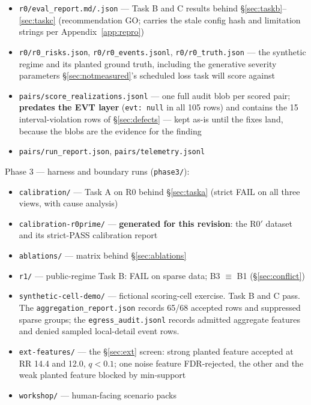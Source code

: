 \documentclass[11pt]{article}
\begin{document}
\begin{itemize}[leftmargin=1.4em,itemsep=1pt]
\item \texttt{r0/eval\_report.md/.json} --- Task B and C results behind
  \S\ref{sec:taskb}--\ref{sec:taskc} (recommendation GO; carries the stale
  config hash and limitation strings per Appendix~\ref{app:repro})
\item \texttt{r0/r0\_risks.json}, \texttt{r0/r0\_events.jsonl},
  \texttt{r0/r0\_truth.json} --- the synthetic regime and its planted
  ground truth, including the generative severity parameters
  \S\ref{sec:notmeasured}'s scheduled loss task will score against
\item \texttt{pairs/score\_realizations.jsonl} --- one full audit blob per
  scored pair; \textbf{predates the EVT layer} (\texttt{evt: null} in all
  105 rows) and contains the 15 interval-violation rows of
  \S\ref{sec:defects} --- kept as-is until the fixes land, because the
  blobs are the evidence for the finding
\item \texttt{pairs/run\_report.json}, \texttt{pairs/telemetry.jsonl}
\end{itemize}

Phase 3 --- harness and boundary runs (\texttt{phase3/}):

\begin{itemize}[leftmargin=1.4em,itemsep=1pt]
\item \texttt{calibration/} --- Task A on R0 behind \S\ref{sec:taska}
  (strict FAIL on all three views, with cause analysis)
\item \texttt{calibration-r0prime/} --- \textbf{generated for this
  revision}: the R0$'$ dataset and its strict-PASS calibration report
\item \texttt{ablations/} --- matrix behind \S\ref{sec:ablations}
\item \texttt{r1/} --- public-regime Task B: FAIL on sparse data;
  B3 $\equiv$ B1 (\S\ref{sec:conflict})
\item \texttt{synthetic-cell-demo/} --- fictional scoring-cell exercise.
  Task B and C pass. The \texttt{aggregation\_\allowbreak report.json}
  records 65/68 accepted rows and suppressed sparse groups; the
  \texttt{egress\_\allowbreak audit.jsonl} records admitted aggregate
  features and denied sampled local-detail event rows.
\item \texttt{ext-features/} --- the \S\ref{sec:ext} screen: strong planted
  feature accepted at RR 14.4 and 12.0, $q < 0.1$; one noise feature
  FDR-rejected, the other and the weak planted feature blocked by
  min-support
\item \texttt{workshop/} --- human-facing scenario packs
\end{itemize}
\end{document}
